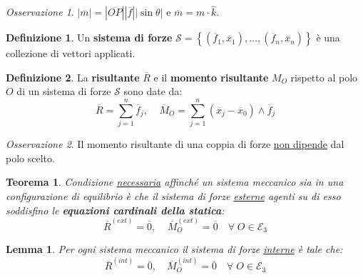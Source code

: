 \documentclass{book}
\theoremstyle{plain}
\newtheorem{teo}{Teorema}[chapter]
\theoremstyle{plain}
\newtheorem*{lemma}{Lemma}
\theoremstyle{plain}
\theoremstyle{plain}
\theoremstyle{plain}
\theoremstyle{definition}
\newtheorem{defi}{Definizione}[chapter]
\theoremstyle{remark}
\newtheorem*{oss}{Osservazione}
\theoremstyle{definition}
\begin{document}
\begin{oss}
    $|\overline{m}|=|\overline{OP}||\overline{f}||\sin{\theta}|$ e $\overline{m}=m \cdot \hat{k}$.
\end{oss}

\begin{defi}
    Un \textbf{sistema di forze} $\mathcal{S}=\left\{\left(\overline{f}_{1}, \overline{x}_{1}\right), \ldots,\left(\overline{f}_{n}, \overline{x}_{n}\right)\right\}$ è una collezione di vettori applicati.
\end{defi}

\begin{defi}
    La \textbf{risultante} $\overline{R}$ e il \textbf{momento risultante} $M_O$ rispetto al polo $O$ di un sistema di forze $\mathcal{S}$ sono date da:
    \begin{displaymath}
    \boxed{
        \overline{R}=\sum_{j=1}^{n} \overline{f}_{j}, \ \ \ \ \ \overline{M}_{O}=\sum_{j=1}^{n}\left(\overline{x}_{j}-\overline{x}_{0}\right) \wedge \overline{f}_{j}
        }
    \end{displaymath}
\end{defi}

\begin{oss}
    Il momento risultante di una coppia di forze \underline{non dipende} dal polo scelto.
\end{oss}

\begin{teo}
    Condizione \underline{necessaria} affinché un sistema meccanico sia in una configurazione di equilibrio è che il sistema di forze \underline{esterne} agenti su di esso soddisfino le \textbf{equazioni cardinali della statica}:
    \begin{displaymath}
    \boxed{
        \overline{R}^{(ext)}=\overline{0}, \ \ \ \ \ \overline{M}_{O}^{(ext)}=\overline{0} \quad \forall \; O \in \mathcal{E}_{3}
        }
    \end{displaymath}
\end{teo}

\begin{lemma}
    Per ogni sistema meccanico il sistema di forze \underline{interne} è tale che:
    \begin{displaymath}
        \overline{R}^{(int)}=\overline{0}, \quad \overline{M}_{O}^{(int)}=\overline{0} \quad \forall \; O \in \mathcal{E}_{3}
    \end{displaymath}
\end{lemma}
\end{document}
